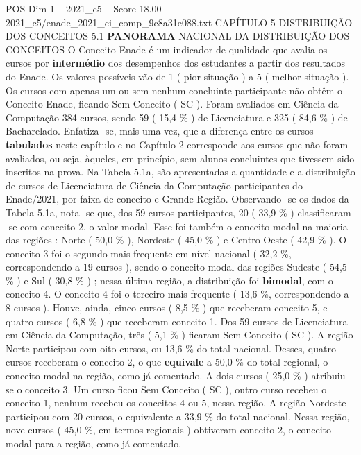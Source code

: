 \begin{textsample}{POS Dim 1 – 2021\_c5 – Score 18.00 – 2021\_c5/enade\_2021\_ci\_comp\_9c8a31e088.txt}  \label{ex:f1_pos_035}
CAPÍTULO 5 DISTRIBUIÇÃO DOS CONCEITOS 5.1 \textbf{PANORAMA} NACIONAL DA DISTRIBUIÇÃO DOS CONCEITOS O Conceito Enade é um indicador de qualidade que avalia os cursos por \textbf{intermédio} dos desempenhos dos estudantes a partir dos resultados do Enade.
Os valores possíveis vão de 1 ( pior situação ) a 5 ( melhor situação ).
Os cursos com apenas um ou sem nenhum concluinte participante não obtêm o Conceito Enade, ficando Sem Conceito ( SC ).
Foram avaliados em Ciência da Computação 384 cursos, sendo 59 ( 15,4 \% ) de Licenciatura e 325 ( 84,6 \% ) de Bacharelado.
Enfatiza -se, mais uma vez, que a diferença entre os cursos \textbf{tabulados} neste capítulo e no Capítulo 2 corresponde aos cursos que não foram avaliados, ou seja, àqueles, em princípio, sem alunos concluintes que tivessem sido inscritos na prova.
Na Tabela 5.1a, são apresentadas a quantidade e a distribuição de cursos de Licenciatura de Ciência da Computação participantes do Enade/2021, por faixa de conceito e Grande Região.
Observando -se os dados da Tabela 5.1a, nota -se que, dos 59 cursos participantes, 20 ( 33,9 \% ) classificaram -se com conceito 2, o valor modal.
Esse foi também o conceito modal na maioria das regiões : Norte ( 50,0 \% ), Nordeste ( 45,0 \% ) e Centro-Oeste ( 42,9 \% ).
O conceito 3 foi o segundo mais frequente em nível nacional ( 32,2 \%, correspondendo a 19 cursos ), sendo o conceito modal das regiões Sudeste ( 54,5 \% ) e Sul ( 30,8 \% ) ; nessa última região, a distribuição foi \textbf{bimodal}, com o conceito 4.
O conceito 4 foi o terceiro mais frequente ( 13,6 \%, correspondendo a 8 cursos ).
Houve, ainda, cinco cursos ( 8,5 \% ) que receberam conceito 5, e quatro cursos ( 6,8 \% ) que receberam conceito 1.
Dos 59 cursos de Licenciatura em Ciência da Computação, três ( 5,1 \% ) ficaram Sem Conceito ( SC ).
A região Norte participou com oito cursos, ou 13,6 \% do total nacional.
Desses, quatro cursos receberam o conceito 2, o que \textbf{equivale} a 50,0 \% do total regional, o conceito modal na região, como já comentado.
A dois cursos ( 25,0 \% ) atribuiu -se o conceito 3.
Um curso ficou Sem Conceito ( SC ), outro curso recebeu o conceito 1, nenhum recebeu os conceitos 4 ou 5, nessa região.
A região Nordeste participou com 20 cursos, o equivalente a 33,9 \% do total nacional.
Nessa região, nove cursos ( 45,0 \%, em termos regionais ) obtiveram conceito 2, o conceito modal para a região, como já comentado.

\end{textsample}
